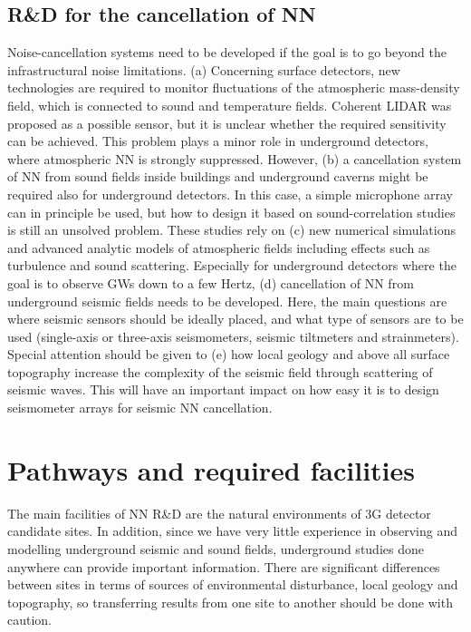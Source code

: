 \subsection{R\&D for the cancellation of NN}
Noise-cancellation systems need to be developed if the goal is to go beyond the infrastructural noise limitations. (a) Concerning surface detectors, new technologies are required to monitor fluctuations of the atmospheric mass-density field, which is connected to sound and temperature fields. Coherent LIDAR was proposed as a possible sensor, but it is unclear whether the required sensitivity can be achieved. This problem plays a minor role in underground detectors, where atmospheric NN is strongly suppressed. However, (b) a cancellation system of NN from sound fields inside buildings and underground caverns might be required also for underground detectors. In this case, a simple microphone array can in principle be used, but how to design it based on sound-correlation studies is still an unsolved problem. These studies rely on (c) new numerical simulations and advanced analytic models of atmospheric fields including effects such as turbulence and sound scattering. Especially for underground detectors where the goal is to observe GWs down to a few Hertz, (d) cancellation of NN from underground seismic fields needs to be developed. Here, the main questions are where seismic sensors should be ideally placed, and what type of sensors are to be used (single-axis or three-axis seismometers, seismic tiltmeters and strainmeters). Special attention should be given to (e) how local geology and above all surface topography increase the complexity of the seismic field through scattering of seismic waves. This will have an important impact on how easy it is to design seismometer arrays for seismic NN cancellation.

\section{Pathways and required facilities}
The main facilities of NN R\&D are the natural environments of 3G detector candidate sites. In addition, since we have very little experience in observing and modelling underground seismic and sound fields, underground studies done anywhere can provide important information. There are significant differences between sites in terms of sources of environmental disturbance, local geology and topography, so transferring results from one site to another should be done with caution.

